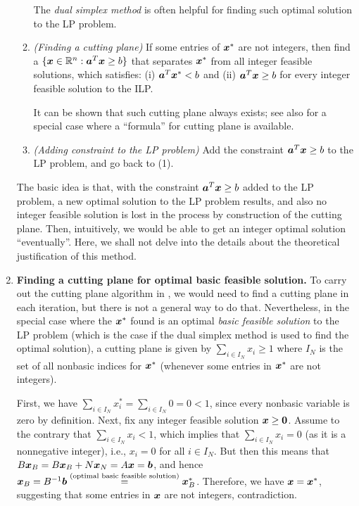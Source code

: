 \begin{enumerate}
\begin{enumerate}[label={(\arabic*)}]
\begin{note}
The \emph{dual simplex method} is often helpful for finding such optimal
solution to the LP problem.
\end{note}

\item \emph{(Finding a cutting plane)} If some entries of \(\bm{x}^{*}\) are
not integers, then find a 
\(\{\bm{x}\in\mathbb{R}^{n}:\bm{a}^{T}\bm{x}\ge b\}\) that separates
\(\bm{x}^{*}\) from all integer feasible solutions, which satisfies: (i)
\(\bm{a}^{T}\bm{x}^{*}<b\) and (ii) \(\bm{a}^{T}\bm{x}\ge b\) for every
integer feasible solution to the ILP.

\begin{note}
It can be shown that such cutting plane always exists; see also
 for a special case where a ``formula'' for
cutting plane is available.
\end{note}

\item \emph{(Adding constraint to the LP problem)} Add the constraint
\(\bm{a}^{T}\bm{x}\ge b\) to the LP problem, and go back to (1).
\end{enumerate}
The basic idea is that, with the constraint \(\bm{a}^{T}\bm{x}\ge b\)
added to the LP problem, a new optimal solution to the LP problem results, and
also no integer feasible solution is lost in the process by construction of the
cutting plane. Then, intuitively, we would be able to get an integer optimal
solution ``eventually''. Here, we shall not delve into the details about the
theoretical justification of this method.
\item\label{it:cut-plane-optim-bfs} \textbf{Finding a cutting plane for optimal
basic feasible solution.} To carry out the cutting plane algorithm in
, we would need to find a cutting plane in each
iteration, but there is not a general way to do that. Nevertheless, in the
special case where the \(\bm{x}^{*}\) found is an optimal \emph{basic
feasible solution} to the LP problem (which is the case if the dual simplex
method is used to find the optimal solution), a cutting plane is given by
\(\boxed{\sum_{i\in I_N}^{}x_i\ge 1}\) where \(I_N\) is the set of all nonbasic
indices for \(\bm{x}^{*}\) (whenever some entries in \(\bm{x}^{*}\) are not
integers).

\begin{pf}
First, we have \(\sum_{i\in I_N}^{}x_{i}^{*}=\sum_{i\in I_N}^{}0=0<1\), since
every nonbasic variable is zero by definition. Next, fix any integer feasible
solution \(\bm{x}\ge\bm{0}\). Assume to the contrary that \(\sum_{i\in
I_N}^{}x_i<1\), which implies that \(\sum_{i\in I_N}^{}x_i=0\) (as it is a
nonnegative integer), i.e., \(x_i=0\) for all \(i\in I_N\). But then this means
that \(B\bm{x}_{B} =B\bm{x}_{B}+N\bm{x}_{N}=A\bm{x}=\bm{b}\), and
hence \(\bm{x}_{B}=B^{-1}\bm{b}\overset{\text{(optimal basic feasible
solution)}}{=}\bm{x}_{B}^{*}\). Therefore, we have \(\bm{x}=\bm{x}^{*}\),
suggesting that some entries in \(\bm{x}\) are not integers, contradiction.
\end{pf}
\end{enumerate}
